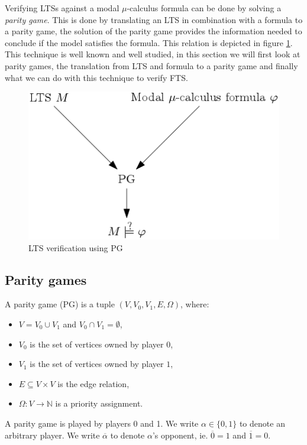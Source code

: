 Verifying LTSs against a modal $\mu$-calculus formula can be done by solving a \textit{parity game}. This is done by translating an LTS in combination with a formula to a parity game, the solution of the parity game provides the information needed to conclude if the model satisfies the formula. This relation is depicted in figure \ref{fig:ltsverificationusingpg}. This technique is well known and well studied, in this section we will first look at parity games, the translation from LTS and formula to a parity game and finally what we can do with this technique to verify FTS.
\begin{figure}[h]
	\centering
	\includegraphics[scale=0.5]{Diagrams/LTSVerificationUsingPG}
	\caption[LTS verification using PG]{LTS verification using PG}
	\label{fig:ltsverificationusingpg}
\end{figure}


\subsection{Parity games}
\begin{definition}
	\label{def_PG}\cite{Bradfield2018}
	A parity game (PG) is a tuple $(V, V_0, V_1, E, \Omega)$, where:
	\begin{itemize}
		\item $V = V_0 \cup V_1$ and $V_0 \cap V_1 = \emptyset$,
		\item $V_0$ is the set of vertices owned by player $0$,
		\item $V_1$ is the set of vertices owned by player $1$, 
		\item $E \subseteq V \times V$ is the edge relation,
		\item $\Omega :  V \rightarrow \mathbb{N}$ is a priority assignment.
	\end{itemize}
\end{definition}
A parity game is played by players 0 and 1. We write $\alpha \in \{0,1\}$ to denote an arbitrary player. We write $\overline{\alpha}$ to denote $\alpha$'s opponent, ie. $\overline{0} = 1$ and $\overline{1} = 0$.

